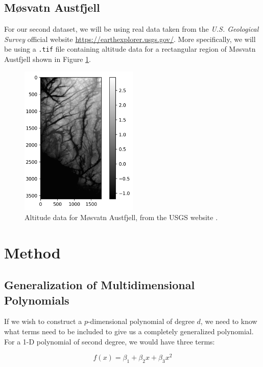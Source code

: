\documentclass[a4paper,10pt,english]{article}
\begin{document}
\subsection{Møsvatn Austfjell}

For our second dataset, we will be using real data taken from the \textit{U.S. Geological Survey} \cite{earthexplorer} official website \url{https://earthexplorer.usgs.gov/}.  More specifically, we will be using a \texttt{.tif} file containing altitude data for a rectangular region of Møsvatn Austfjell shown in Figure \ref{fig_austfjell}.

\begin{figure}[H]
	\centering
	\includegraphics[width = 0.5\textwidth, center]{real_data.png}
	\caption{Altitude data for Møsvatn Austfjell, from the USGS website \cite{earthexplorer}.\label{fig_austfjell}}
\end{figure}	



\section{Method}
\label{sec:method}

\subsection{Generalization of Multidimensional Polynomials}

If we wish to construct a $p$-dimensional polynomial of degree $d$, we need to know what terms need to be included to give us a completely generalized polynomial.  For a 1-D polynomial of second degree, we would have three terms:

\begin{equation*}
f(x) = \beta_1 + \beta_2 x + \beta_3 x^2
\end{equation*}
\end{document}
